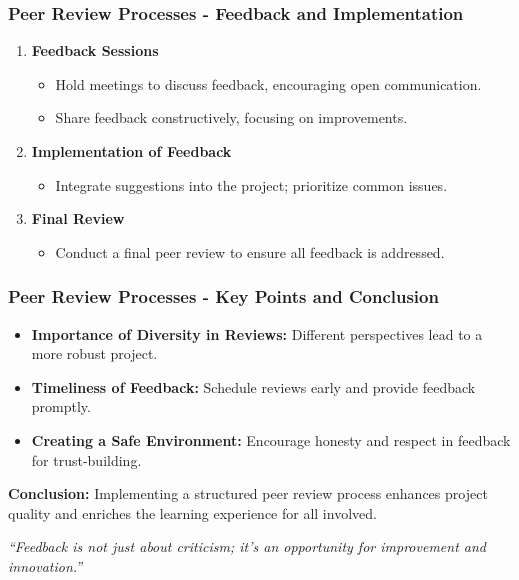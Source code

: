\documentclass[aspectratio=169]{beamer}
\begin{document}
\begin{frame}[fragile]
    \frametitle{Peer Review Processes - Feedback and Implementation}
    \begin{enumerate}[resume]
        \item \textbf{Feedback Sessions}
        \begin{itemize}
            \item Hold meetings to discuss feedback, encouraging open communication.
            \item Share feedback constructively, focusing on improvements.
        \end{itemize}

        \item \textbf{Implementation of Feedback}
        \begin{itemize}
            \item Integrate suggestions into the project; prioritize common issues.
        \end{itemize}

        \item \textbf{Final Review}
        \begin{itemize}
            \item Conduct a final peer review to ensure all feedback is addressed.
        \end{itemize}
    \end{enumerate}
\end{frame}

\begin{frame}[fragile]
    \frametitle{Peer Review Processes - Key Points and Conclusion}
    \begin{itemize}
        \item \textbf{Importance of Diversity in Reviews:} Different perspectives lead to a more robust project.
        \item \textbf{Timeliness of Feedback:} Schedule reviews early and provide feedback promptly.
        \item \textbf{Creating a Safe Environment:} Encourage honesty and respect in feedback for trust-building.
    \end{itemize}

    \bigskip
    \textbf{Conclusion:} 
    Implementing a structured peer review process enhances project quality and enriches the learning experience for all involved.
    
    \bigskip
    \textit{“Feedback is not just about criticism; it’s an opportunity for improvement and innovation.”}
\end{frame}
\end{document}
